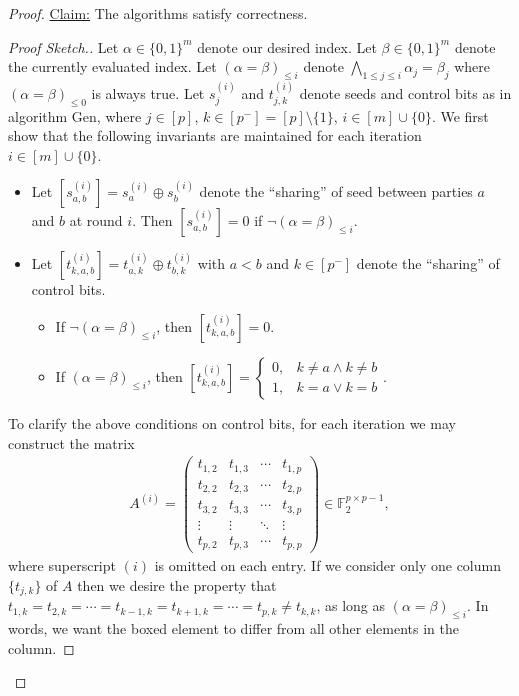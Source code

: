 \documentclass[11pt]{article}
\newcommand{\Gen}{\textsf{Gen}}
\begin{document}
\begin{proof}
\underline{Claim:} The algorithms satisfy correctness.
\begin{proof}
[Proof Sketch.]Let $\alpha \in \{0,1\}^m$ denote our desired index. Let $\beta \in \{0,1\}^m$ denote the currently evaluated index. Let $(\alpha = \beta)_{\le i}$ denote $\bigwedge_{1 \le j \le i} \alpha_j = \beta_j$ where $(\alpha = \beta)_{\le 0}$ is always true. Let $s_j^{(i)}$ and $t_{j,k}^{(i)}$ denote seeds and control bits as in algorithm \Gen, where $j \in [p]$, $k \in [p^-] = [p] \setminus \{1\}$, $i \in [m] \cup \{0\}$. We first show that the following invariants are maintained for each iteration $i \in [m] \cup \{0\}$.
\begin{itemize}
\item Let $[s_{a,b}^{(i)}] = s_a^{(i)} \oplus s_b^{(i)}$ denote the ``sharing'' of seed between parties $a$ and $b$ at round $i$. Then $[s_{a,b}^{(i)}] = 0$ if $\lnot (\alpha = \beta)_{\le i}$.
\item Let $[t_{k,a,b}^{(i)}] = t_{a,k}^{(i)} \oplus t_{b,k}^{(i)}$ with $a < b$ and $k \in [p^-]$ denote the ``sharing'' of control bits.
\begin{itemize}
\item If $\lnot (\alpha = \beta)_{\le i}$, then $[t_{k,a,b}^{(i)}] = 0$.
\item If $(\alpha = \beta)_{\le i}$, then $[t_{k,a,b}^{(i)}] = \begin{cases} 0, &k \neq a \land k \neq b\\1, &k = a \lor k = b\end{cases}$.
\end{itemize}
\end{itemize}
To clarify the above conditions on control bits, for each iteration we may construct the matrix
\begin{align*} 
A^{(i)} = \begin{pmatrix}
t_{1,2} & t_{1,3} & \cdots & t_{1,p}\\
\boxed{t_{2,2}} & t_{2,3} & \cdots & t_{2,p}\\
t_{3,2} & \boxed{t_{3,3}} & \cdots & t_{3,p}\\
\vdots & \vdots & \ddots & \vdots\\
t_{p,2} & t_{p,3} & \cdots & \boxed{t_{p,p}}
\end{pmatrix} \in \mathbb{F}_2^{p \times p-1},
\end{align*}
where superscript $(i)$ is omitted on each entry. If we consider only one column $\{t_{j,k}\}$ of $A$ then we desire the property that $t_{1,k} = t_{2,k} = \cdots = t_{k-1, k} = t_{k+1,k} = \cdots = t_{p,k} \neq t_{k,k}$, as long as $(\alpha = \beta)_{\le i}$. In words, we want the boxed element to differ from all other elements in the column.


\end{proof}
\end{proof}
\end{document}
